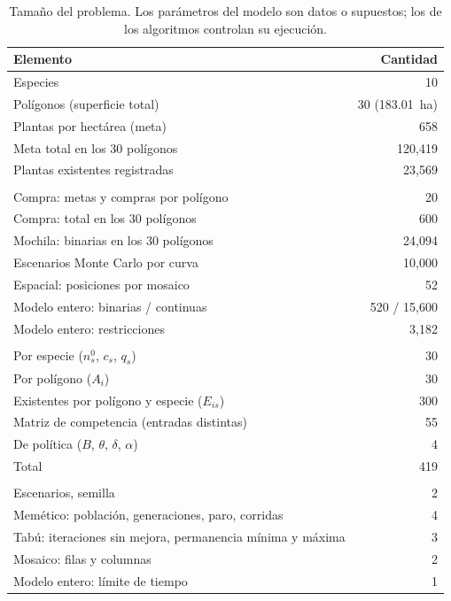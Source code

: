 \begin{table}[t]
\centering
\caption{Tamaño del problema. Los parámetros del modelo son datos o supuestos; los de los algoritmos controlan su ejecución.}
\label{tab:tamano}
\small
\begin{tabularx}{\columnwidth}{@{}>{\RaggedRight\arraybackslash}X r@{}}
\toprule
Elemento & Cantidad \\
\midrule
Especies & 10 \\
Polígonos (superficie total) & 30 (183.01~ha) \\
Plantas por hectárea (meta) & 658 \\
Meta total en los 30 polígonos & 120{,}419 \\
Plantas existentes registradas & 23{,}569 \\
\midrule
\multicolumn{2}{@{}l}{\textit{Variables}} \\
Compra: metas y compras por polígono & 20 \\
Compra: total en los 30 polígonos & 600 \\
Mochila: binarias en los 30 polígonos & 24{,}094 \\
Escenarios Monte Carlo por curva & 10{,}000 \\
Espacial: posiciones por mosaico & 52 \\
Modelo entero: binarias / continuas & 520 / 15{,}600 \\
Modelo entero: restricciones & 3{,}182 \\
\midrule
\multicolumn{2}{@{}l}{\textit{Parámetros del modelo}} \\
Por especie ($n_s^0$, $c_s$, $q_s$) & 30 \\
Por polígono ($A_i$) & 30 \\
Existentes por polígono y especie ($E_{is}$) & 300 \\
Matriz de competencia (entradas distintas) & 55 \\
De política ($B$, $\theta$, $\delta$, $\alpha$) & 4 \\
Total & 419 \\
\midrule
\multicolumn{2}{@{}l}{\textit{Parámetros de los algoritmos}} \\
Escenarios, semilla & 2 \\
Memético: población, generaciones, paro, corridas & 4 \\
Tabú: iteraciones sin mejora, permanencia mínima y máxima & 3 \\
Mosaico: filas y columnas & 2 \\
Modelo entero: límite de tiempo & 1 \\
\bottomrule
\end{tabularx}
\end{table}




